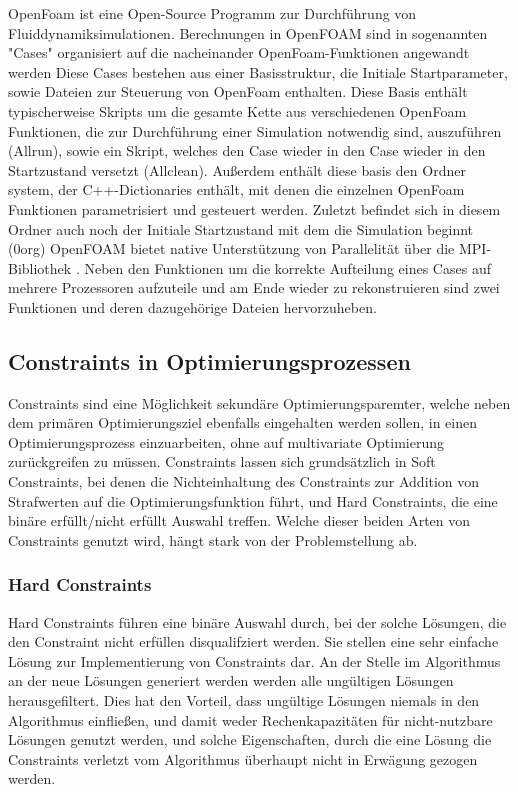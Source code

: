 OpenFoam \cite{OpenCFD.} ist eine Open-Source Programm zur Durchführung von Fluiddynamiksimulationen.
Berechnungen in OpenFOAM sind in sogenannten "Cases" organisiert auf die nacheinander OpenFoam-Funktionen angewandt werden
Diese Cases bestehen aus einer Basisstruktur, die Initiale Startparameter, sowie Dateien zur Steuerung von OpenFoam enthalten.
Diese Basis enthält typischerweise Skripts um die gesamte Kette aus verschiedenen OpenFoam Funktionen, die zur Durchführung einer Simulation notwendig sind, auszuführen (Allrun), sowie ein Skript, welches den Case wieder in den Case wieder in den Startzustand versetzt (Allclean).
Außerdem enthält diese basis den Ordner system, der C++-Dictionaries enthält, mit denen die einzelnen OpenFoam Funktionen parametrisiert und gesteuert werden.
Zuletzt befindet sich in diesem Ordner auch noch der Initiale Startzustand mit dem die Simulation beginnt (0org)
OpenFOAM bietet native Unterstützung von Parallelität über die MPI-Bibliothek \cite{OpenMPI.}.
Neben den Funktionen um die korrekte Aufteilung eines Cases auf mehrere Prozessoren aufzuteile und am Ende wieder zu rekonstruieren sind zwei Funktionen und deren dazugehörige Dateien hervorzuheben.


\subsection{Constraints in Optimierungsprozessen}
Constraints sind eine Möglichkeit sekundäre Optimierungsparemter, welche neben dem primären Optimierungsziel ebenfalls eingehalten werden sollen, in einen Optimierungsprozess einzuarbeiten, ohne auf multivariate Optimierung zurückgreifen zu müssen.
Constraints lassen sich grundsätzlich in Soft Constraints, bei denen die Nichteinhaltung des Constraints zur Addition von Strafwerten auf die Optimierungsfunktion führt, und Hard Constraints, die eine binäre erfüllt/nicht erfüllt Auswahl treffen.
Welche dieser beiden Arten von Constraints genutzt wird, hängt stark von der Problemstellung ab.

\subsubsection{Hard Constraints}

Hard Constraints führen eine binäre Auswahl durch, bei der solche Lösungen, die den Constraint nicht erfüllen disqualifziert werden.
Sie stellen eine sehr einfache Lösung zur Implementierung von Constraints dar.
An der Stelle im Algorithmus an der neue Lösungen generiert werden werden alle ungültigen Lösungen herausgefiltert.
Dies hat den Vorteil, dass ungültige Lösungen niemals in den Algorithmus einfließen, und damit weder Rechenkapazitäten für nicht-nutzbare Lösungen genutzt werden, und solche Eigenschaften, durch die eine Lösung die Constraints verletzt vom Algorithmus überhaupt nicht in Erwägung gezogen werden.


